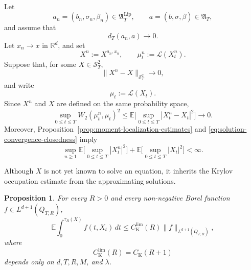 \documentclass[12pt,oneside, reqno]{amsart}
\newtheorem{proposition}[theorem]{Proposition}
\numberwithin{equation}{section}
\begin{document}
	Let
	\[
	a_n=(b_n,\sigma_n,\overline\beta_n)
	\in\mathfrak A_T^{\mathrm{Lip}},
	\qquad
	a=(b,\sigma,\overline\beta)\in\mathfrak A_T,
	\]
	and assume that
	\begin{equation}
		\label{eq:coefficient-convergence-closedness}
		d_T(a_n,a)\longrightarrow0.
	\end{equation}
	Let $x_n\to x$ in $\mathbb R^d$, and set
	\[
	X^n:=X^{a_n,x_n},
	\qquad
	\mu_t^n:=\mathcal L(X_t^n).
	\]
	Suppose that, for some $X\in\mathcal S_T^2$,
	\begin{equation}
		\label{eq:solution-convergence-closedness}
		\|X^n-X\|_{\mathcal S_T^2}
		\longrightarrow0,
	\end{equation}
	and write
	\[
	\mu_t:=\mathcal L(X_t).
	\]
	Since $X^n$ and $X$ are defined on the same probability space,
	\begin{equation}
		\label{eq:uniform-law-convergence}
		\sup_{0\leq t\leq T}	W_2(\mu_t^n,\mu_t)^2\leq\mathbb E\big[\sup_{0\leq t\leq T}|X_t^n-X_t|^2\big]
		\longrightarrow0.
	\end{equation}
	Moreover, Proposition~\ref{prop:moment-localization-estimates} and
	\eqref{eq:solution-convergence-closedness} imply
	\begin{equation}
		\label{eq:uniform-moment-closedness}
		\sup_{n\geq1}\mathbb E\big[\sup_{0\leq t\leq T}|X_t^n|^2\big]
		+\mathbb E\big[\sup_{0\leq t\leq T}|X_t|^2\big]	<\infty.
	\end{equation}
	
	Although $X$ is not yet known to solve an equation, it inherits the
	Krylov occupation estimate from the approximating solutions.
	
	\begin{proposition}
		\label{prop:limit-krylov-estimate}
		For every $R>0$ and every non-negative Borel function
		$f\in L^{d+1}(Q_{T,R})$,
		\begin{equation}
			\label{eq:limit-krylov-estimate}
			\mathbb E\int_0^{\tau_R(X)}
			f(t,X_t)\,dt
			\leq
			C_{\mathrm K}^{\mathrm{lim}}(R)
			\|f\|_{L^{d+1}(Q_{T,R})},
		\end{equation}
		where
		\[
		C_{\mathrm K}^{\mathrm{lim}}(R)
		=
		C_{\mathrm K}(R+1)
		\]
		depends only on $d,T,R,M$, and $\lambda$.
	\end{proposition}
	
\end{document}
